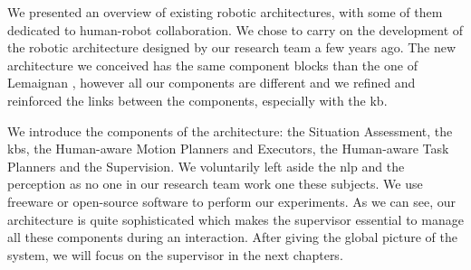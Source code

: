 \documentclass[a4paper,11pt,twoside]{StyleThese}
\begin{document}
We presented an overview of existing robotic architectures, with some of them dedicated to human-robot collaboration. We chose to carry on the development of the robotic architecture designed by our research team a few years ago. The new architecture we conceived has the same component blocks than the one of Lemaignan \etal{}, however all our components are different and we refined and reinforced the links between the components, especially with the \acrlong{kb}. 

We introduce the components of the architecture: the Situation Assessment, the \acrshort{kb}s, the Human-aware Motion Planners and Executors, the Human-aware Task Planners and the Supervision. We voluntarily left aside the \acrshort{nlp} and the perception as no one in our research team work one these subjects. We use freeware or open-source software to perform our experiments. As we can see, our architecture is quite sophisticated which makes the supervisor essential to manage all these components during an interaction. After giving the global picture of the system, we will focus on the supervisor in the next chapters.

\ifdefined{}
\else


\end{document}
